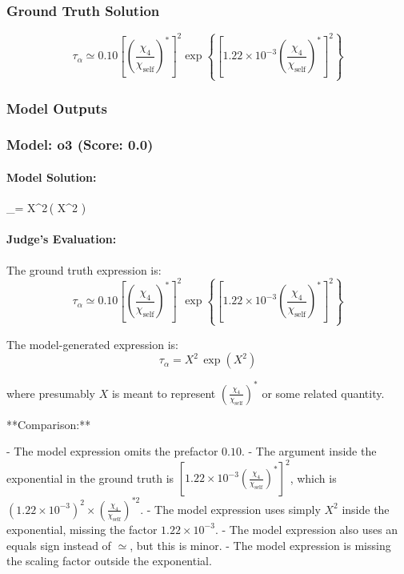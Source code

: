 \documentclass[10pt]{article}
\begin{document}
\subsubsection*{Ground Truth Solution}
\[ \boxed{\tau_{\alpha} \simeq 0.10 \left[\left(\frac{\chi_4}{\chi_{\text{self}}}\right)^*\right]^{2} \exp\left\{ \left[ 1.22 \times 10^{-3} \left(\frac{\chi_4}{\chi_{\text{self}}}\right)^* \right]^{2} \right\}} \]

\subsubsection*{Model Outputs}
\subsubsection*{Model: o3 (Score: 0.0)}
\paragraph*{Model Solution:}
\displaystyle \tau_\alpha = X^{2}\,\exp\!\left( X^{2} \right)

\paragraph*{Judge's Evaluation:}

The ground truth expression is:
\[
\tau_{\alpha} \simeq 0.10 \left[\left(\frac{\chi_4}{\chi_{\text{self}}}\right)^*\right]^{2} \exp\left\{ \left[ 1.22 \times 10^{-3} \left(\frac{\chi_4}{\chi_{\text{self}}}\right)^* \right]^{2} \right\}
\]

The model-generated expression is:
\[
\tau_\alpha = X^{2}\,\exp\!\left( X^{2} \right)
\]

where presumably \(X\) is meant to represent \(\left(\frac{\chi_4}{\chi_{\text{self}}}\right)^*\) or some related quantity.

**Comparison:**

- The model expression omits the prefactor \(0.10\).
- The argument inside the exponential in the ground truth is \(\left[1.22 \times 10^{-3} \left(\frac{\chi_4}{\chi_{\text{self}}}\right)^*\right]^2\), which is \((1.22 \times 10^{-3})^2 \times \left(\frac{\chi_4}{\chi_{\text{self}}}\right)^{*2}\).
- The model expression uses simply \(X^2\) inside the exponential, missing the factor \(1.22 \times 10^{-3}\).
- The model expression also uses an equals sign instead of \(\simeq\), but this is minor.
- The model expression is missing the scaling factor outside the exponential.
\end{document}
